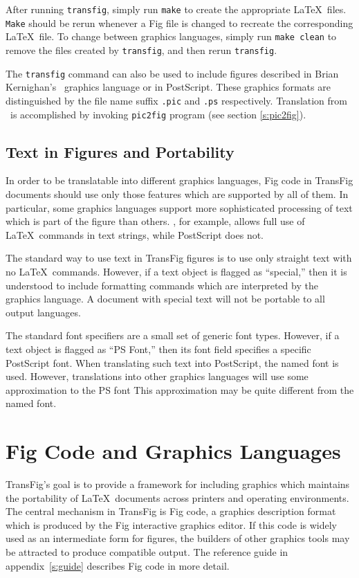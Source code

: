 After running {\tt transfig}, simply run {\tt make} to create the 
	appropriate \LaTeX\ files.
{\tt Make} should be rerun whenever a Fig file is changed to recreate
	the corresponding \LaTeX\ file.
To change between graphics languages, simply run {\tt make clean} to
	remove the files created by {\tt transfig}, and then rerun
	{\tt transfig}.

The {\tt transfig} command can also be used to include figures described in
	Brian Kernighan's \PIC\ graphics language or in PostScript.
These graphics formats are distinguished by the file name suffix
	{\tt .pic} and {\tt .ps} respectively.
Translation from \PIC\ is accomplished by invoking {\tt pic2fig} program
	(see section \ref{s:pic2fig}).

\subsection{Text in Figures and Portability}
\label{s:portability}

In order to be translatable into different graphics languages, Fig code
	in TransFig documents should use only those features which
	are supported by all of them.
In particular, some graphics languages support more sophisticated processing
	of text which is part of the figure than others.
\PicTeX, for example, allows full use of \LaTeX\ commands in text strings,
	while PostScript does not.

The standard way to use text in TransFig figures is to use only
	straight text with no \LaTeX\ commands.
However, if a text object is flagged as ``special,'' 
	then it is understood to include formatting commands which are
	interpreted by the graphics language.
A document with special text will not be portable to all output languages.

The standard font specifiers are a small set of generic font types.
However, if a text object is flagged as ``PS Font,'' then its font field
	specifies a specific PostScript font.
When translating such text into PostScript, the named font is used.
However, translations into other graphics languages will use some
	approximation to the PS font
This approximation may be quite different from the named font.

\vfill
\pagebreak
\section{Fig Code and Graphics Languages}
\label{s:languages}

TransFig's goal is to provide a framework for including graphics which
	maintains the portability of \LaTeX\ documents across
	printers and operating environments.
The central mechanism in TransFig is Fig code, a graphics description
	format which is produced by the Fig interactive graphics editor.
If this code is widely used as an intermediate form for figures,
	the builders of other graphics tools may be attracted
	to produce compatible output.
The reference guide in appendix~\ref{s:guide} describes Fig code in more
	detail.

